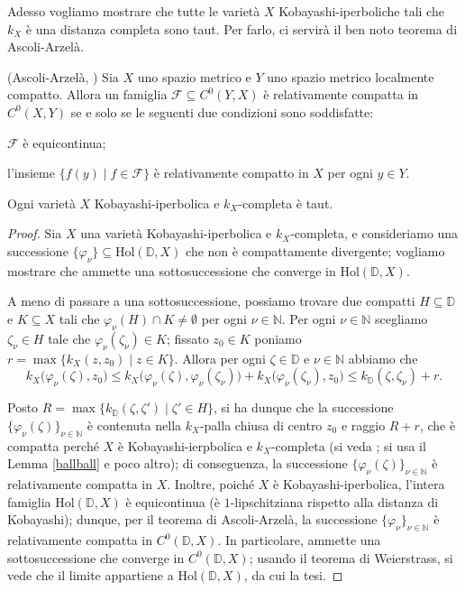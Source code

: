 Adesso vogliamo mostrare che tutte le varietà $X$ Kobayashi-iperboliche  tali che $k_X$ è una distanza completa sono taut. Per farlo, ci servirà il ben noto teorema di Ascoli-Arzelà.

\begin{thm}
    (Ascoli-Arzelà, \cite[Chapter 7, Theorem 17]{Ke}) Sia $X$ uno spazio metrico e $Y$ uno spazio metrico localmente compatto. Allora un famiglia $\mathcal{F}\subseteq C^0(Y,X)$ è relativamente compatta in $C^0(X,Y)$ se e solo se le seguenti due condizioni sono soddisfatte:
    \begin{nlist}
        \item $\mathcal{F}$ è equicontinua;
        \item l'insieme $\{f(y)\mid f\in\mathcal{F}\}$ è relativamente compatto in $X$ per ogni $y\in Y$.
    \end{nlist}
\end{thm}

\begin{prop} \label{comp_is_taut}
    Ogni varietà $X$ Kobayashi-iperbolica e $k_X$-completa è taut.
\end{prop}

\begin{proof}
    Sia $X$ una varietà Kobayashi-iperbolica e $k_X$-completa, e consideriamo una successione $\{\varphi_\nu\}\subseteq\text{Hol}(\mathbb{D},X)$ che non è compattamente divergente; vogliamo mostrare che ammette una sottosuccessione che converge in $\text{Hol}(\mathbb{D},X)$.

    A meno di passare a una sottosuccessione, possiamo trovare due compatti $H\subseteq\mathbb{D}$ e $K\subseteq X$ tali che $\varphi_\nu(H)\cap K\not=\emptyset$ per ogni $\nu\in\mathbb{N}$. Per ogni $\nu\in\mathbb{{N}}$ scegliamo $\zeta_\nu\in H$ tale che $\varphi_\nu(\zeta_\nu)\in K$; fissato $z_0\in K$ poniamo $r=\max\{k_X(z,z_0)\mid z\in K\}$. Allora per ogni $\zeta\in\mathbb{D}$ e $\nu\in\mathbb{N}$ abbiamo che
    $$k_X\big(\varphi_\nu(\zeta),z_0\big) \le k_X\big(\varphi_\nu(\zeta),\varphi_\nu(\zeta_\nu)\big)+k_X\big(\varphi_\nu(\zeta_\nu),z_0\big) \le k_{\mathbb{D}} (\zeta,\zeta_\nu)+r.$$

    Posto $R=\max\{k_{\mathbb{D}}(\zeta,\zeta')\mid \zeta'\in H\}$, si ha dunque che la successione $\{\varphi_\nu(\zeta)\}_{\nu\in\mathbb{N}}$ è contenuta nella $k_X$-palla chiusa di centro $z_0$ e raggio $R+r$, che è compatta perché $X$ è Kobayashi-ierpbolica e $k_X$-completa (si veda \cite[Proposition 2.3.17]{A1}; si usa il Lemma \ref{ballball} e poco altro); di conseguenza, la successione $\{\varphi_\nu(\zeta)\}_{\nu\in\mathbb{N}}$ è relativamente compatta in $X$. Inoltre, poiché $X$ è Kobayashi-iperbolica, l'intera famiglia $\text{Hol}(\mathbb{D},X)$ è equicontinua (è $1$-lipschitziana rispetto alla distanza di Kobayashi); dunque, per il teorema di Ascoli-Arzelà, la successione $\{\varphi_\nu\}_{\nu\in\mathbb{N}}$ è relativamente compatta in $C^0(\mathbb{D},X)$. In particolare, ammette una sottosuccessione che converge in $C^0(\mathbb{D},X)$; usando il teorema di Weierstrass, si vede che il limite appartiene a $\text{Hol}(\mathbb{D},X)$, da cui la tesi.
\end{proof}

